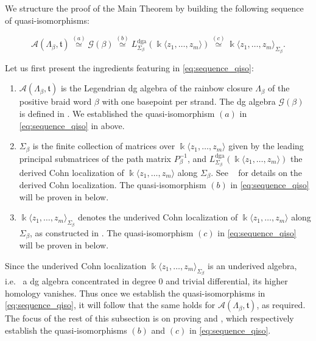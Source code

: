 \documentclass[11pt]{article}
\newcommand{\kk}{\Bbbk}
\newcommand{\La}{\Lambda}
\newcommand{\SA}{\mathcal A}
\newcommand{\ST}{\mathfrak t}
\newcommand{\cG}{\mathcal G}
\begin{document}
We structure the proof of the Main Theorem by building the following sequence of quasi-isomorphisms:

\begin{equation}\label{eq:sequence_qiso}
\SA(\La_\beta,\ST)\stackrel{(a)}{\simeq}\cG(\beta)\stackrel{(b)}{\simeq}L^{\mathrm{dga}}_{\Sigma_\beta}(\kk\langle z_1,\ldots,z_m\rangle)\stackrel{(c)}{\simeq} \kk\langle z_1,\ldots,z_m\rangle_{\Sigma_\beta}.
\end{equation}

Let us first present the ingredients featuring in \eqref{eq:sequence_qiso}:

\begin{enumerate}[label=(\alph*)]
    \item $\SA(\La_\beta,\ST)$ is the Legendrian dg algebra of the rainbow closure $\Lambda_\beta$ of the positive braid word $\beta$ with one basepoint per strand. The dg algebra $\cG(\beta)$ is defined in . We established the quasi-isomorphism $(a)$ in \eqref{eq:sequence_qiso} in  above.

    \item $\Sigma_\beta$ is the finite collection of matrices over $\kk\langle z_1,\ldots,z_m\rangle$ given by the leading principal submatrices of the path matrix $P_\beta^{-1}$, and $L^{\mathrm{dga}}_{\Sigma_\beta}(\kk\langle z_1,\ldots,z_m\rangle)$ the derived Cohn localization of $\kk\langle z_1,\ldots,z_m\rangle$ along $\Sigma_\beta$. See ~\cite[Definition 4.35]{BCL} for details on the derived Cohn localization. The quasi-isomorphism $(b)$ in \eqref{eq:sequence_qiso} will be proven in  below.

    \item $\kk\langle z_1,\ldots,z_m\rangle_{\Sigma_\beta}$ denotes the underived Cohn localization of $\kk\langle z_1,\ldots,z_m\rangle$ along $\Sigma_\beta$, as constructed in \cite[Chapter 7]{CohnBook}. The quasi-isomorphism $(c)$ in \eqref{eq:sequence_qiso} will be proven in  below.
\end{enumerate}

Since the underived Cohn localization $\kk\langle z_1,\ldots,z_m\rangle_{\Sigma_\beta}$ is an underived algebra, i.e.~ a dg algebra concentrated in degree 0 and trivial differential, its higher homology vanishes. Thus once we establish the quasi-isomorphisms in \eqref{eq:sequence_qiso}, it will follow that the same holds for $\SA(\La_\beta,\ST)$, as required. The focus of the rest of this subsection is on proving  and , which respectively establish the quasi-isomorphisms $(b)$ and $(c)$ in \eqref{eq:sequence_qiso}.
\end{document}
